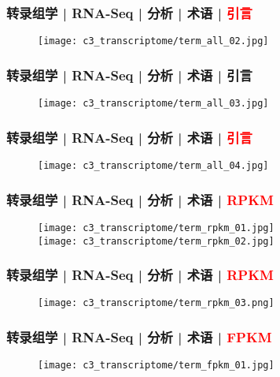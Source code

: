 \begin{frame}
  \frametitle{转录组学 | RNA-Seq | 分析 | 术语 | \textcolor{red}{引言}}
  \begin{figure}
    \centering
    \texttt{[image: c3\_transcriptome/term\_all\_02.jpg]}
  \end{figure}
\end{frame}

\begin{frame}
  \frametitle{转录组学 | RNA-Seq | 分析 | 术语 | 引言}
  \begin{figure}
    \centering
    \texttt{[image: c3\_transcriptome/term\_all\_03.jpg]}
  \end{figure}
\end{frame}

\begin{frame}
  \frametitle{转录组学 | RNA-Seq | 分析 | 术语 | \textcolor{red}{引言}}
  \begin{figure}
    \centering
    \texttt{[image: c3\_transcriptome/term\_all\_04.jpg]}
  \end{figure}
\end{frame}

\begin{frame}
  \frametitle{转录组学 | RNA-Seq | 分析 | 术语 | \textcolor{red}{RPKM}}
  \begin{figure}
    \centering
    \texttt{[image: c3\_transcriptome/term\_rpkm\_01.jpg]}\\
    \vspace{1em}
    \texttt{[image: c3\_transcriptome/term\_rpkm\_02.jpg]}
  \end{figure}
\end{frame}

\begin{frame}
  \frametitle{转录组学 | RNA-Seq | 分析 | 术语 | \textcolor{red}{RPKM}}
  \begin{figure}
    \centering
    \texttt{[image: c3\_transcriptome/term\_rpkm\_03.png]}
  \end{figure}
\end{frame}

\begin{frame}
  \frametitle{转录组学 | RNA-Seq | 分析 | 术语 | \textcolor{red}{FPKM}}
  \begin{figure}
    \centering
    \texttt{[image: c3\_transcriptome/term\_fpkm\_01.jpg]}
  \end{figure}
\end{frame}

